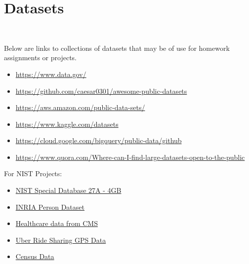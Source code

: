 \section{Datasets}\label{datasets}
\FILENAME\

Below are links to collections of datasets that may be of use for
homework assignments or projects.

\begin{itemize}

\item
  \url{https://www.data.gov/}
\item
  \url{https://github.com/caesar0301/awesome-public-datasets}
\item
  \url{https://aws.amazon.com/public-data-sets/}
\item
  \url{https://www.kaggle.com/datasets}
\item
  \url{https://cloud.google.com/bigquery/public-data/github}
\item
  \url{https://www.quora.com/Where-can-I-find-large-datasets-open-to-the-public}
\end{itemize}

For NIST Projects:

\begin{itemize}

\item
  \href{http://www.nist.gov/itl/iad/ig/sd27a.cfm}{NIST Special Database
  27A - 4GB}
\item
  \href{http://pascal.inrialpes.fr/data/human/}{INRIA Person Dataset}
\item
  \href{https://www.cms.gov/Research-Statistics-Data-and-Systems/Downloadable-Public-Use-Files/Part-B-National-Summary-Data-File/Overview.html}{Healthcare
  data from CMS}
\item
  \href{https://github.com/fivethirtyeight/uber-tlc-foil-response}{Uber
  Ride Sharing GPS Data}
\item
  \href{http://www.census.gov/population/www/cen2010/glance/}{Census
  Data}
\end{itemize}
